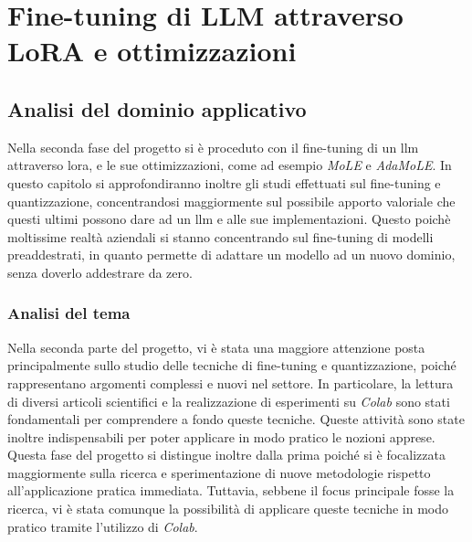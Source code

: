  \chapter{Fine-tuning di LLM attraverso LoRA e ottimizzazioni}
\label{chap:descrizione-stage-2}
\section{Analisi del dominio applicativo}
Nella seconda fase del progetto si è proceduto con il \gls{fine-tuning} di un \gls{llm} attraverso \gls{lora}, e le sue ottimizzazioni, come ad esempio \textit{MoLE} e \textit{AdaMoLE}. In questo capitolo si approfondiranno inoltre gli studi effettuati sul \gls{fine-tuning} e quantizzazione, concentrandosi maggiormente sul possibile apporto valoriale che questi ultimi possono dare ad un \gls{llm} e alle sue implementazioni.
Questo poichè moltissime realtà aziendali si stanno concentrando sul \gls{fine-tuning} di modelli preaddestrati, in quanto permette di adattare un modello ad un nuovo dominio, senza doverlo addestrare da zero.
    \subsection{Analisi del tema}
    Nella seconda parte del progetto, vi è stata una maggiore attenzione posta principalmente sullo studio delle tecniche di \gls{fine-tuning} e quantizzazione, poiché rappresentano argomenti complessi e nuovi nel settore. In particolare, la lettura di diversi articoli scientifici e la realizzazione di esperimenti su \textit{Colab} sono stati fondamentali per comprendere a fondo queste tecniche. Queste attività sono state inoltre indispensabili per poter applicare in modo pratico le nozioni apprese.
    Questa fase del progetto si distingue inoltre dalla prima poiché si è focalizzata maggiormente sulla ricerca e sperimentazione di nuove metodologie rispetto all'applicazione pratica immediata. Tuttavia, sebbene il focus principale fosse la ricerca, vi è stata comunque la possibilità di applicare queste tecniche in modo pratico tramite l'utilizzo di \textit{Colab}.



